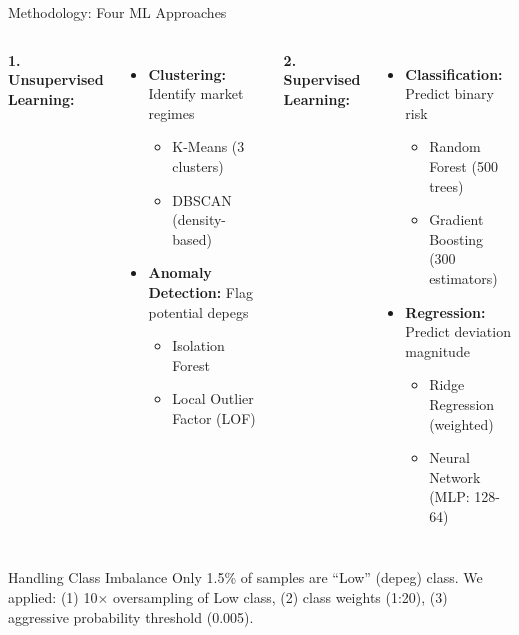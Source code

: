 \documentclass[aspectratio=169]{beamer}
\begin{document}
\begin{frame}{Methodology: Four ML Approaches}
\begin{columns}[t]
\textbf{1. Unsupervised Learning:}
\begin{itemize}
    \item \textbf{Clustering:} Identify market regimes
    \begin{itemize}
        \item K-Means (3 clusters)
        \item DBSCAN (density-based)
    \end{itemize}
    \item \textbf{Anomaly Detection:} Flag potential depegs
    \begin{itemize}
        \item Isolation Forest
        \item Local Outlier Factor (LOF)
    \end{itemize}
\end{itemize}

\textbf{2. Supervised Learning:}
\begin{itemize}
    \item \textbf{Classification:} Predict binary risk
    \begin{itemize}
        \item Random Forest (500 trees)
        \item Gradient Boosting (300 estimators)
    \end{itemize}
    \item \textbf{Regression:} Predict deviation magnitude
    \begin{itemize}
        \item Ridge Regression (weighted)
        \item Neural Network (MLP: 128-64)
    \end{itemize}
\end{itemize}
\end{columns}

\vspace{0.3cm}
\begin{block}{Handling Class Imbalance}
Only 1.5\% of samples are ``Low'' (depeg) class. We applied: (1) 10$\times$ oversampling of Low class, (2) class weights (1:20), (3) aggressive probability threshold (0.005).
\end{block}
\end{frame}
\end{document}
